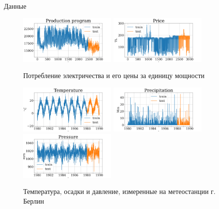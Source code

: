 	\begin{frame}{Данные}
		\setlength{\parskip}{0.0001cm}
		
		\begin{figure}[h]
			\centering
			\includegraphics[width=0.43\textwidth, keepaspectratio]{../../figs/Electricity_Production}
			\includegraphics[width=0.43\textwidth, keepaspectratio]{../../figs/Electricity_Price}
			\caption{Потребление электричества и его цены за единицу мощности}\label{fig:electr_data}
		\end{figure}
		
		\begin{figure}[h]
			\centering
			\includegraphics[width=0.43\textwidth, keepaspectratio]{../../figs/Temperature.png}
			\includegraphics[width=0.43\textwidth, keepaspectratio]{../../figs/Precipitation.png}
			\includegraphics[width=0.43\textwidth, keepaspectratio]{../../figs/Pressure.png}
			\caption{Температура, осадки и давление, измеренные на метеостанции г. Берлин}\label{fig:weather_data}
		\end{figure}
		
	\end{frame}
	
